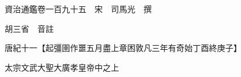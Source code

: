 










 


 
 


 

  
  
  
  
  





  
  
  
  
  
 
  

  

  
  
  



  

 
 

  
   




  

  
  


  　　資治通鑑卷一百九十五　宋　司馬光　撰

　　胡三省　音註

　　唐紀十一【起彊圉作噩五月盡上章困敦凡三年有奇始丁酉終庚子】

　　太宗文武大聖大廣孝皇帝中之上

